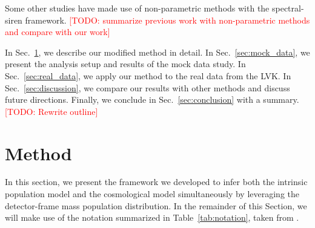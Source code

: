 \documentclass[sn-aps, pdflatex]{sn-jnl}
\newcommand{\todo}[1]{\textcolor{red}{[TODO: #1]}}
\begin{document}
Some other studies have made use of non-parametric methods with the spectral-siren framework.
\todo{summarize previous work with non-parametric methods and compare with our work}

In Sec.~\ref{sec:method}, we describe our modified method in detail.
In Sec.~\ref{sec:mock_data}, we present the analysis setup and results of the mock data study.
In Sec.~\ref{sec:real_data}, we apply our method to the real data from the \ac{LVK}.
In Sec.~\ref{sec:discussion}, we compare our results with other methods and discuss future directions.
Finally, we conclude in Sec.~\ref{sec:conclusion} with a summary.
\todo{Rewrite outline}

\section{Method}
\label{sec:method}

In this section, we present the framework we developed to infer both the intrinsic population model and the cosmological model simultaneously by leveraging the detector-frame mass population distribution.
In the remainder of this Section, we will make use of the notation summarized in Table~\ref{tab:notation}, taken from \cite{Rinaldi:2021bhm, Rinaldi:2022kyg}.
\end{document}
